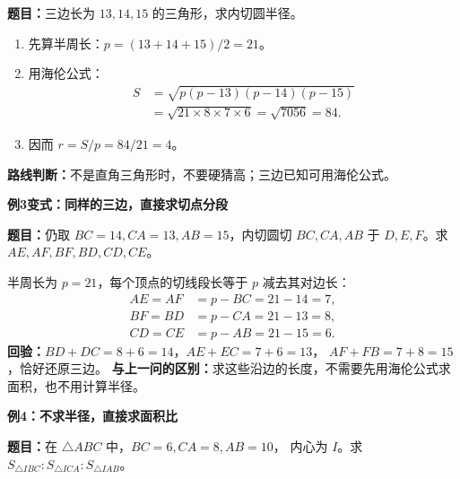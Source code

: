 \begin{examplebox}
\begin{minipage}{\linewidth}
\textbf{题目：}三边长为 $13,14,15$ 的三角形，求内切圆半径。
\end{minipage}\par
\begin{enumerate}[leftmargin=*,itemsep=0.45em]
 \item 先算半周长：$p=(13+14+15)/2=21$。
 \item 用海伦公式：
 \[
 \begin{aligned}
 S&=\sqrt{p(p-13)(p-14)(p-15)}\\
  &=\sqrt{21\times8\times7\times6}
   =\sqrt{7056}=84.
 \end{aligned}
 \]
 \item 因而 $r=S/p=84/21=\boxed{4}$。
\end{enumerate}
\textbf{路线判断：}不是直角三角形时，不要硬猜高；三边已知可用海伦公式。

\medskip
\par\noindent\begin{minipage}{\linewidth}
\textbf{\textcolor{CExample}{例3变式：同样的三边，直接求切点分段}}

\textbf{题目：}仍取 $BC=14,CA=13,AB=15$，内切圆切 $BC,CA,AB$
于 $D,E,F$。求 $AE,AF,BF,BD,CD,CE$。
\end{minipage}\par
半周长为 $p=21$，每个顶点的切线段长等于 $p$ 减去其对边长：
\[
\begin{aligned}
 AE=AF&=p-BC=21-14=\boxed{7},\\
 BF=BD&=p-CA=21-13=\boxed{8},\\
 CD=CE&=p-AB=21-15=\boxed{6}.
\end{aligned}
\]
\textbf{回验：}$BD+DC=8+6=14$，$AE+EC=7+6=13$，
$AF+FB=7+8=15$，恰好还原三边。
\textbf{与上一问的区别：}求这些沿边的长度，不需要先用海伦公式求面积，也不用计算半径。

\medskip
\par\noindent\begin{minipage}{\linewidth}
\textbf{\textcolor{CExample}{例4：不求半径，直接求面积比}}

\textbf{题目：}在 $\triangle ABC$ 中，$BC=6,CA=8,AB=10$，
内心为 $I$。求
$S_{\triangle IBC}:S_{\triangle ICA}:S_{\triangle IAB}$。
\end{minipage}\par


\end{examplebox}
